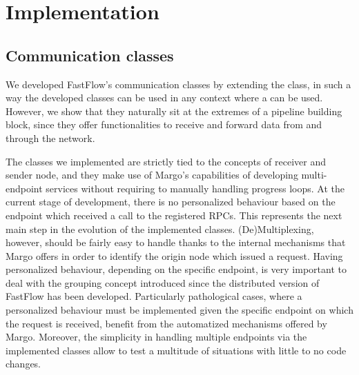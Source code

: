 \chapter{Implementation}
\label{sec:implementation}
\section{Communication classes}
We developed FastFlow's communication classes by extending the  class, in such a way the developed classes can be used in any context where a  can be used. However, we show that they naturally sit at the extremes of a pipeline building block, since they offer functionalities to receive and forward data from and through the network.\newline

The classes we implemented are strictly tied to the concepts of receiver and sender node, and they make use of Margo's capabilities of developing multi-endpoint services without requiring to manually handling progress loops. At the current stage of development, there is no personalized behaviour based on the endpoint which received a call to the registered RPCs. This represents the next main step in the evolution of the implemented classes. (De)Multiplexing, however, should be fairly easy to handle thanks to the internal mechanisms that Margo offers in order to identify the origin node which issued a request. Having personalized behaviour, depending on the specific endpoint, is very important to deal with the grouping concept introduced since the distributed version of FastFlow has been developed. Particularly pathological cases, where a personalized behaviour must be implemented given the specific endpoint on which the request is received, benefit from the automatized mechanisms offered by Margo. Moreover, the simplicity in handling multiple endpoints via the implemented classes allow to test a multitude of situations with little to no code changes.\newline

